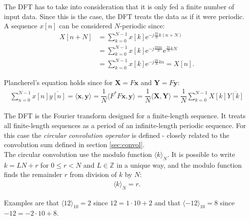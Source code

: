 The DFT has to take into consideration that it is only fed a finite number of input data. Since this is the case, the DFT treats the data as if it were periodic. A sequence $x[n]$ can be considered $N$-periodic since:
\begin{align*}
	X[n+N]
	&= \sum_{k=0}^{N-1} x[k] \text{e}^{-j \frac{2 \pi}{N}  k (n		+N)} \\
	&= \sum_{k=0}^{N-1} x[k] \text{e}^{-j \frac{2 \pi k n}{N}}		\text{e}^{\frac{2 \pi}{N} kN} \\
	&= \sum_{k=0}^{N-1} x[k] \text{e}^{-j \frac{2 \pi}{N} k n} 		= X[n].
\end{align*}

Plancherel's equation holds since for $\textbf{X} = F\textbf{x}$ and $\textbf{Y} = F\textbf{y}$:
\begin{align*}
\sum_{n=0}^{N-1} x[n] \overline{y[n]} = \langle \textbf{x},\textbf{y} \rangle = \dfrac{1}{N} \langle F^*F\textbf{x},\textbf{y} \rangle = \dfrac{1}{N} \langle \textbf{X},\textbf{Y} \rangle = \dfrac{1}{N} \sum_{k=0}^{N-1} X[k] \overline{Y[k]}
\end{align*}

The DFT is the Fourier transform designed for a finite-length sequence.
It treats all finite-length sequences as a period of an infinite-length periodic sequence.
For this case the \textit{circular convolution operator} is defined - closely related to the convolution sum defined in section \ref{sec:convol}.   \\
The circular convolution use the modulo function $\langle k\rangle_N$. It is possible to write $k = LN+r$ for $0 \leq r < N$ and $L \in \mathbb{Z}$ in a unique way, and the modulo function finds the remainder $r$ from division of $k$ by $N$:
\begin{align*}
\langle k \rangle_N = r.
\end{align*}

Examples are that $\langle 12 \rangle_{10} = 2$ since $12 = 1 \cdot 10 + 2$ and that $\langle -12 \rangle_{10} = 8$ since $-12 = -2 \cdot 10 + 8$.

